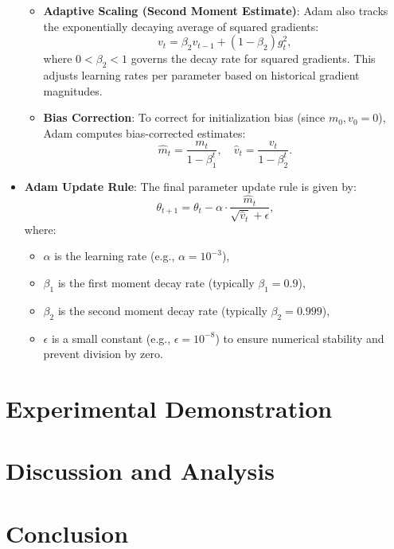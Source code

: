 \documentclass[12pt,a4paper]{article}
\theoremstyle{definition}
\begin{document}
\begin{itemize}
\begin{itemize}
        \item \textbf{Adaptive Scaling (Second Moment Estimate)}: Adam also tracks the exponentially decaying average of squared gradients:
        \[
        v_t = \beta_2 v_{t-1} + (1 - \beta_2) g_t^2,
        \]
        where $0 < \beta_2 < 1$ governs the decay rate for squared gradients. This adjusts learning rates per parameter based on historical gradient magnitudes.

        \item \textbf{Bias Correction}: To correct for initialization bias (since $m_0, v_0 = 0$), Adam computes bias-corrected estimates:
        \[
        \hat{m}_t = \frac{m_t}{1 - \beta_1^t}, \quad \hat{v}_t = \frac{v_t}{1 - \beta_2^t}.
        \]
    \end{itemize}

    \item \textbf{Adam Update Rule}: The final parameter update rule is given by:
    \[
    \theta_{t+1} = \theta_t - \alpha \cdot \frac{\hat{m}_t}{\sqrt{\hat{v}_t} + \epsilon},
    \]
    where:
    \begin{itemize}
        \item $\alpha$ is the learning rate (e.g., $\alpha = 10^{-3}$),
        \item $\beta_1$ is the first moment decay rate (typically $\beta_1 = 0.9$),
        \item $\beta_2$ is the second moment decay rate (typically $\beta_2 = 0.999$),
        \item $\epsilon$ is a small constant (e.g., $\epsilon = 10^{-8}$) to ensure numerical stability and prevent division by zero.
    \end{itemize}

\end{itemize}







\section{Experimental Demonstration}

\section{Discussion and Analysis}

\section{Conclusion}
\end{document}
